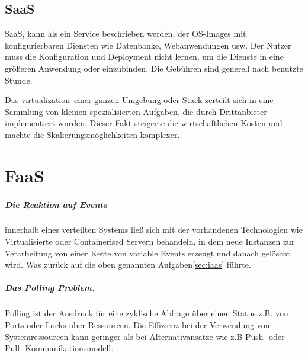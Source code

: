 \documentclass[
12pt,
english,
ngerman,
headsepline,
twoside,
openright,
numbers=noenddot,version=first
]{scrreprt}
\begin{document}
\section{SaaS} 
\label{sec:saas}
\acrfull{SaaS}, kann als ein Service beschrieben werden, der OS-Images mit konfigurierbaren Diensten wie Datenbanke, Webanwendungen usw. Der Nutzer muss die Konfiguration und Deployment nicht lernen, um die Dienste in eine größeren Anwendung oder einzubinden. Die Gebühren sind generell nach benutzte Stunde. 


Das \glqq\Gls{virtualization}\grqq\ einer ganzen Umgebung oder Stack zerteilt sich in eine Sammlung von kleinen spezialisierten Aufgaben, die durch Drittanbieter implementiert wurden. Dieser Fakt steigerte die wirtschaftlichen Kosten und machte die Skalierungsmöglichkeiten komplexer\cite{patternAWS}.


\chapter{FaaS}%

\paragraph{Die Reaktion auf Events}\label{par:event-reaction} innerhalb eines verteilten Systems ließ sich mit der vorhandenen Technologien wie Virtualisierte oder Containerised Servern behandeln, in dem neue Instanzen zur Verarbeitung von einer Kette von variable Events erzeugt und danach gelöscht wird. Was zurück auf die oben genannten Aufgaben\ref{sec:iaas} führte.\cite{lambdaAWS}

\paragraph{Das Polling Problem.}\label{par:polling}
Polling ist der Ausdruck für eine zyklische Abfrage über einen Status z.B. von Ports oder Locks über Ressourcen. Die Effizienz bei der Verwendung von Systemressourcen kann geringer als bei Alternativansätze wie z.B Push- oder Pull- Kommunikationsmodell.\cite{lambdaAWS}
\end{document}
